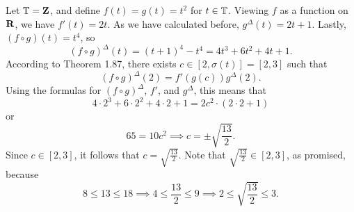 \documentclass[nonumber]{homework}
\begin{document}
	\maketitle
	
	 Let $\mathbb{T} = \textbf{Z}$, and define $f(t) = g(t) = t^2$ for $t \in \mathbb{T}$. Viewing $f$ as a function on $\textnormal{\bf R}$, we have $f'(t) = 2t$. As we have calculated before, $g^\Delta(t) = 2t + 1$. Lastly, $(f \circ g)(t) = t^4$, so
	\begin{equation*}
		(f\circ g)^\Delta(t) = (t+1)^4 - t^4 = 4t^3 + 6t^2 + 4t + 1.
	\end{equation*}
	According to Theorem 1.87, there exists $c \in [2, \sigma(t)] = [2, 3]$ such that
	\begin{equation*}
		(f\circ g)^\Delta(2) = f'(g(c))g^\Delta(2).
	\end{equation*}
	Using the formulas for $(f\circ g)^\Delta$, $f'$, and $g^\Delta$, this means that
	\begin{equation*}
		4\cdot 2^3 + 6\cdot 2^2 + 4\cdot 2 + 1 = 2c^2\cdot (2\cdot 2 + 1)
	\end{equation*}
	or
	\begin{equation*}
		65 = 10c^2 \implies c = \pm \sqrt{\frac{13}{2}}.
	\end{equation*}
	Since $c \in [2,3]$, it follows that $c = \sqrt{\frac{13}{2}}$. Note that $\sqrt{\frac{13}{2}} \in [2,3]$, as promised, because
	\begin{equation*}
		8 \le 13 \le 18 \implies 4 \le \frac{13}{2} \le 9 \implies 2 \le \sqrt{\frac{13}{2}} \le 3.
	\end{equation*}
\end{document}
